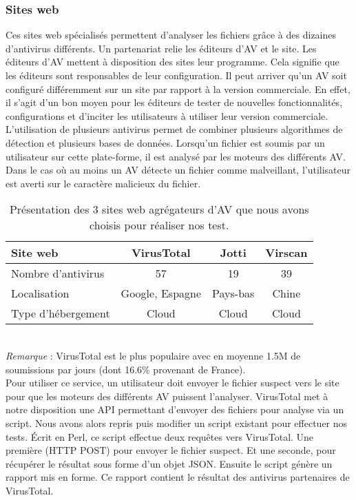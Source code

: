 \documentclass{svjour3}
\begin{document}
\subsubsection{Sites web}
\label{2.2.1sites}
Ces sites web spécialisés permettent d'analyser les fichiers grâce à des dizaines d'antivirus différents. Un partenariat relie les éditeurs d'AV et le site. Les éditeurs d'AV mettent à disposition des sites leur programme. Cela signifie que les éditeurs sont responsables de leur configuration. Il peut arriver qu'un AV soit configuré différemment sur un site par rapport à la version commerciale. En effet, il s'agit d'un bon moyen pour les éditeurs de tester de nouvelles fonctionnalités, configurations et d'inciter les utilisateurs à utiliser leur version commerciale. L'utilisation de plusieurs antivirus permet de combiner plusieurs algorithmes de détection et plusieurs bases de données. Lorsqu'un fichier est soumis par un utilisateur sur cette plate-forme, il est analysé par les moteurs des différents AV. Dans le cas où au moins un AV détecte un fichier comme malveillant, l'utilisateur est averti sur le caractère malicieux du fichier.
\begin{table}[ht!]
	\begin{center}
		\begin{normalsize}
			\begin{tabular}{|l|c|c|c|}
  			\hline
   			\textbf{Site web} & \textbf{VirusTotal} & \textbf{Jotti} & \textbf{Virscan} \\
   			\hline
  			Nombre d'antivirus & 57 & 19 & 39\\
  			\hline
  			Localisation & Google, Espagne & Pays-bas & Chine\\
  			\hline
  			Type d’hébergement & Cloud & Cloud & Cloud\\
  			\hline
			\end{tabular}
		\end{normalsize}
	\end{center}
	\caption{Présentation des 3 sites web agrégateurs d'AV que nous avons choisis pour réaliser nos test.}
\end{table}
\\
\textit{Remarque} : VirusTotal est le plus populaire avec en moyenne 1.5M de soumissions par jours (dont 16.6\% provenant de France).\\
$ $\\
Pour utiliser ce service, un utilisateur doit envoyer le fichier suspect vers le site pour que les moteurs des différents AV puissent l'analyser. VirusTotal met à notre disposition une API permettant d'envoyer des fichiers pour analyse via un script. Nous avons alors repris puis modifier un script \cite{API} existant pour effectuer nos tests. Écrit en Perl, ce script effectue deux requêtes vers VirusTotal. Une première (HTTP POST) pour envoyer le fichier suspect. Et une seconde, pour récupérer le résultat sous forme d'un objet JSON. Ensuite le script génère un rapport mis en forme. Ce rapport contient le résultat des antivirus partenaires de VirusTotal.\\
\end{document}
